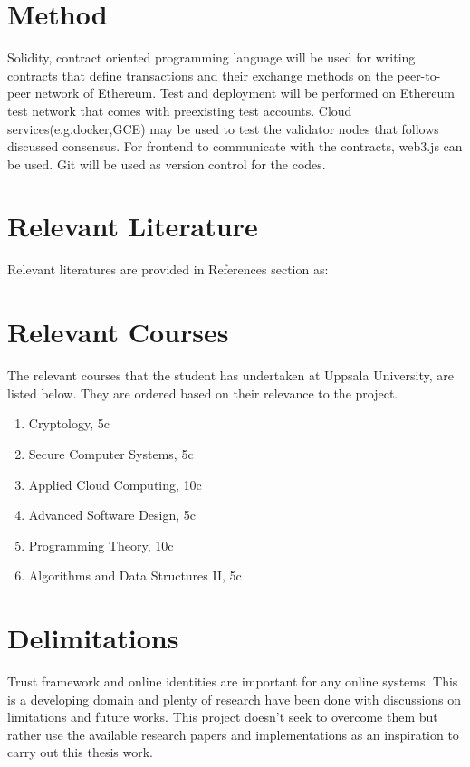 \documentclass[a4paper,11pt,dvipsnames]{article}
\begin{document}
	\section*{Method}
	Solidity, \cite{solidity} contract oriented programming language will be 
	used for writing contracts that define transactions and their exchange 
	methods on the peer-to-peer network of Ethereum. \cite{ethereum_whitepaper} 
	Test and deployment will be performed on Ethereum test network that comes 
	with preexisting test accounts. Cloud services(e.g.docker,GCE)  may 
	be used to test the validator nodes that follows discussed consensus. For 
	frontend to communicate with the contracts, web3.js can be used. Git will 
	be used as version control for the codes.
	\section*{Relevant Literature}
	Relevant literatures are provided in References section as:
	\cite{literature1} \cite{literature2} \cite{ilprints562}

	\section*{Relevant Courses}
	The relevant courses that the student has undertaken at Uppsala University, 
	are listed below. They are ordered based on their relevance to the project.
	\begin{enumerate}
		\item Cryptology, 5c
		\item Secure Computer Systems, 5c
		\item Applied Cloud Computing, 10c
		\item Advanced Software Design, 5c
		\item Programming Theory, 10c
		\item Algorithms and Data Structures II, 5c
	\end{enumerate}

	\section*{Delimitations}
	Trust framework and online identities are important for any online systems. 
	This is a developing domain and plenty of research have been done with 
	discussions on limitations and future works. This project doesn’t seek to 
	overcome them but rather use the available research papers and 
	implementations as an inspiration to carry out this thesis work.
	
\end{document}
